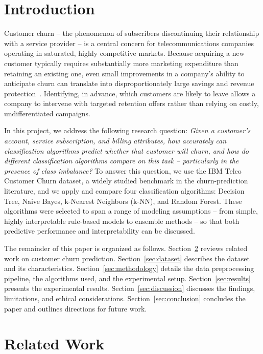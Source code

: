 \documentclass[conference]{IEEEtran}
\begin{document}
	\section{Introduction}
	\label{sec:introduction}
	
	Customer churn -- the phenomenon of subscribers discontinuing their relationship with a service provider -- is a central concern for telecommunications companies operating in saturated, highly competitive markets. Because acquiring a new customer typically requires substantially more marketing expenditure than retaining an existing one, even small improvements in a company's ability to anticipate churn can translate into disproportionately large savings and revenue protection~\cite{b2}. Identifying, in advance, which customers are likely to leave allows a company to intervene with targeted retention offers rather than relying on costly, undifferentiated campaigns.
	
	In this project, we address the following research question: \textit{Given a customer's account, service subscription, and billing attributes, how accurately can classification algorithms predict whether that customer will churn, and how do different classification algorithms compare on this task -- particularly in the presence of class imbalance?} To answer this question, we use the IBM Telco Customer Churn dataset, a widely studied benchmark in the churn-prediction literature, and we apply and compare four classification algorithms: Decision Tree, Naive Bayes, k-Nearest Neighbors (k-NN), and Random Forest. These algorithms were selected to span a range of modeling assumptions -- from simple, highly interpretable rule-based models to ensemble methods -- so that both predictive performance and interpretability can be discussed.
	
	The remainder of this paper is organized as follows. Section~\ref{sec:related_work} reviews related work on customer churn prediction. Section~\ref{sec:dataset} describes the dataset and its characteristics. Section~\ref{sec:methodology} details the data preprocessing pipeline, the algorithms used, and the experimental setup. Section~\ref{sec:results} presents the experimental results. Section~\ref{sec:discussion} discusses the findings, limitations, and ethical considerations. Section~\ref{sec:conclusion} concludes the paper and outlines directions for future work.
	
	\section{Related Work}
	\label{sec:related_work}
	
\end{document}
